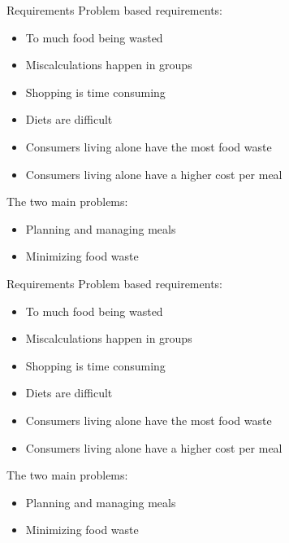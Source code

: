\begin{frame}{Requirements}%
	Problem based requirements:
	\begin{itemize}
		\item To much food being wasted
		\item Miscalculations happen in groups
		\item Shopping is time consuming
		\item Diets are difficult
		\item Consumers living alone have the most food waste
		\item Consumers living alone have a higher cost per meal
	\end{itemize}
	The two main problems:
	\begin{itemize}
		\item Planning and managing meals
		\item Minimizing food waste
	\end{itemize}
\end{frame}
\begin{frame}{Requirements}%
	Problem based requirements:
	\begin{itemize}
		\item {\color{dkgreen}To much food being wasted}
		\item {\color{red}Miscalculations happen in groups}
		\item {\color{orange}Shopping is time consuming}
		\item {\color{dkgreen}Diets are difficult}
		\item {\color{red}Consumers living alone have the most food waste}
		\item {\color{red}Consumers living alone have a higher cost per meal}
	\end{itemize}
	The two main problems:
	\begin{itemize} \color{dkgreen}
		\item Planning and managing meals
		\item Minimizing food waste
	\end{itemize}
\end{frame}
